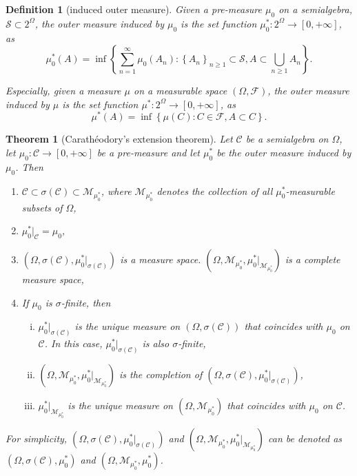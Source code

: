 \documentclass{report}
\newtheorem{definition}{Definition}[section]
\newtheorem{theorem}{Theorem}[section]
\theoremstyle{nonumberplain}
\begin{document}
\begin{definition}[induced outer measure]
	Given a pre-measure $\mu_0$ on a semialgebra, $\mathcal{S}\subset2^\Omega$, the \emph{outer measure induced by $\mu_0$} is the set function $\mu_0^*:2^\Omega\to[0,+\infty]$, as
	\[
	\mu^{*}_0(A) = \inf \left\{\sum_{n=1}^{\infty} \mu_0\left(A_{n}\right):\left\{A_{n}\right\}_{n \geq 1} \subset \mathcal{S}, A \subset \bigcup_{n \geq 1} A_{n}\right\}.
	\]

	Especially, given a measure $\mu$ on a measurable space $(\Omega,\mathcal{F})$, the \emph{outer measure induced by $\mu$} is the set function $\mu^*:2^\Omega\to[0,+\infty]$, as
	\[
	\mu^{*}(A) = \inf \left\{ \mu\left(C\right):C \in\mathcal{F}, A \subset C\right\}.
	\]
\end{definition}

\begin{theorem}[Carathéodory's extension theorem]
	Let $\mathcal{C}$ be a semialgebra on $\Omega$, let $\mu_0:\mathcal{C}\to[0,+\infty]$ be a pre-measure and let $\mu_0^*$ be the outer measure induced by $\mu_0$. Then
	\begin{enumerate}[(1)]
		\item $\mathcal{C}\subset\sigma(\mathcal{C})\subset\mathcal{M}_{\mu^{*}_0}$, where $\mathcal{M}_{\mu^{*}_0}$ denotes the collection of all $\mu^{*}_0$-measurable subsets of $\Omega$,
		\item $\mu^{*}_0|_{\mathcal{C}}=\mu_0$,
		\item $(\Omega, \sigma(\mathcal{C}), \mu_0^{*}|_{\sigma(\mathcal{C})})$ is a measure space. $(\Omega, \mathcal{M}_{\mu^{*}_0}, \mu_0^{*}|_{\mathcal{M}_{\mu^{*}_0}})$ is a complete measure space, 
		\item If $\mu_0$ is $\sigma$-finite, then
		\begin{enumerate}[(i)]
			\item $\mu^{*}_0|_{\sigma(\mathcal{C})}$ is the unique measure on $(\Omega, \sigma(\mathcal{C}))$ that coincides with $\mu_0$ on $\mathcal{C}$. In this case, $\mu^{*}_0|_{\sigma(\mathcal{C})}$ is also $\sigma$-finite,
			\item $(\Omega, \mathcal{M}_{\mu_0^{*}}, \mu_0^{*}|_{\mathcal{M}_{\mu^{*}_0}})$ is the completion of $(\Omega, \sigma(\mathcal{C}), \mu_0^{*}|_{\sigma(\mathcal{C})})$,
			\item $\mu^{*}_0|_{\mathcal{M}_{\mu^{*}_0}}$ is the unique measure on $(\Omega, \mathcal{M}_{\mu^{*}_0})$ that coincides with $\mu_0$ on $\mathcal{C}$.
		\end{enumerate}
	\end{enumerate}
	For simplicity, $(\Omega, \sigma(\mathcal{C}), \mu_0^{*}|_{\sigma(\mathcal{C})})$ and $(\Omega, \mathcal{M}_{\mu^{*}_0}, \mu_0^{*}|_{\mathcal{M}_{\mu^{*}_0}})$ can be denoted as $(\Omega, \sigma(\mathcal{C}), \mu_0^{*})$ and $(\Omega, \mathcal{M}_{\mu^{*}_0}, \mu_0^{*})$.
\end{theorem}
\end{document}
